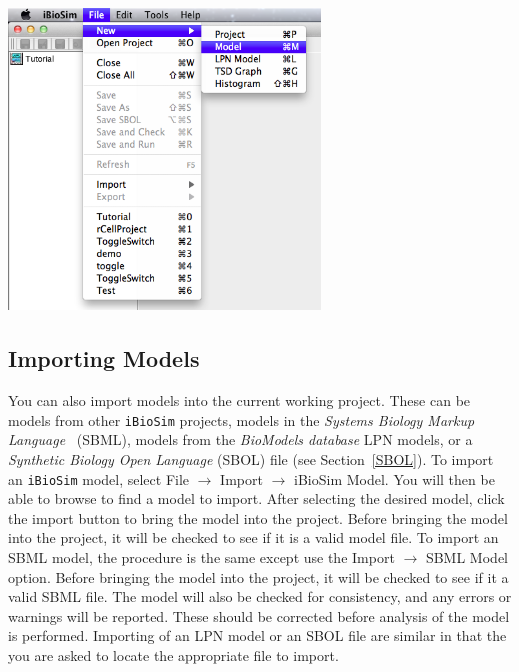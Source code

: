 \documentclass[titlepage,11pt]{article}
\begin{document}
\begin{center}
\includegraphics[height=80mm]{screenshots/newModel}
\end{center}

\clearpage

\subsection{Importing Models}

\noindent
You can also import models into the current working project.  These can be models from other {\tt iBioSim} projects, models in the 
\emph{Systems Biology Markup Language}
~(SBML),  models from the
\emph{BioModels database}
LPN models, or a 
\emph{Synthetic Biology Open Language}
(SBOL) file (see Section~\ref{SBOL}). 
To import an {\tt iBioSim} model, select File $\rightarrow$ Import $\rightarrow$ iBioSim Model.  
You will then be able to browse to find a model to import.  After  selecting the desired model, click the import button to bring the model into the project.  Before bringing the model into the project, it will be checked to see if it is a valid model file.  To import an SBML model, the procedure is the same except use the Import $\rightarrow$ SBML Model option.  Before bringing the model into the project, it will be checked to see if it a valid SBML file.  
The model will also be checked for consistency, and any errors or warnings will be reported.  These should be corrected before analysis of the model is performed.  Importing of an LPN model or an SBOL file are similar in that the you are asked to locate the appropriate file to import.
\end{document}
